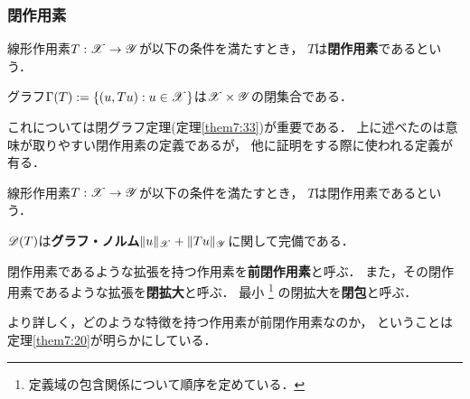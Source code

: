     \subsubsection{閉作用素}
    \begin{Def}[閉作用素/1]
        線形作用素$T: \mathscr{X} \to \mathscr{Y}$が以下の条件を満たすとき，
        $T$は\textbf{閉作用素}であるという．
        \begin{center}
            グラフ$\Gamma(T):=\{ (u, Tu) : u \in \mathscr{X} \}$は$\mathscr{X} \times \mathscr{Y}$の閉集合である．
        \end{center}
    \end{Def}
    これについては閉グラフ定理(定理\ref{them7:33})が重要である．
    上に述べたのは意味が取りやすい閉作用素の定義であるが，
    他に証明をする際に使われる定義が有る．
    \begin{Def}[閉作用素/2]
        線形作用素$T: \mathscr{X} \to \mathscr{Y}$が以下の条件を満たすとき，
        $T$は閉作用素であるという．
        \begin{center}
            $\mathscr{D}(T)$は\textbf{グラフ・ノルム}$\|u\|_{\mathscr{X}}+\|Tu\|_{\mathscr{Y}}$に関して完備である．
        \end{center}
    \end{Def}

    \begin{Def}
        閉作用素であるような拡張を持つ作用素を\textbf{前閉作用素}と呼ぶ．
        また，その閉作用素であるような拡張を\textbf{閉拡大}と呼ぶ．
        最小 \footnote{定義域の包含関係について順序を定めている．} の閉拡大を\textbf{閉包}と呼ぶ．
    \end{Def}
    より詳しく，どのような特徴を持つ作用素が前閉作用素なのか，
    ということは定理\ref{them7:20}が明らかにしている．

